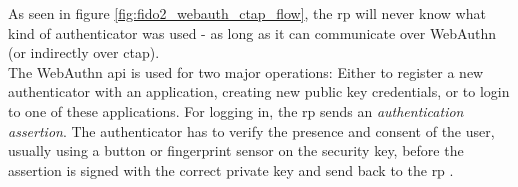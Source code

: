 \noindent As seen in figure \ref{fig:fido2_webauth_ctap_flow}, the \ac{rp} will never know what kind of authenticator was used - as long as it can communicate over WebAuthn (or indirectly over \ac{ctap}).\\
The WebAuthn \ac{api} is used for two major operations: Either to register a new authenticator with an application, creating new public key credentials, or to login to one of these applications. For logging in, the \ac{rp} sends an \emph{authentication assertion}. The authenticator has to verify the presence and consent of the user, usually using a button or fingerprint sensor on the security key, before the assertion is signed with the correct private key and send back to the \ac{rp} \cite{webauthn_standard,mdn_webauthn}.